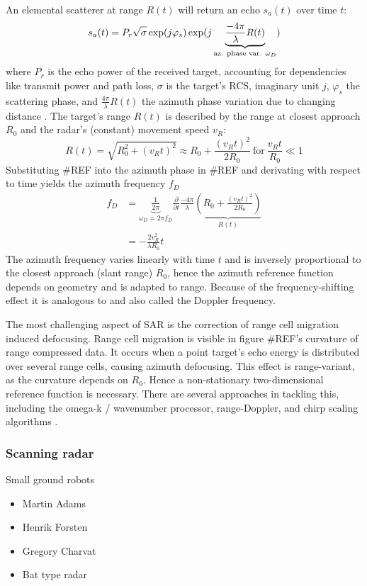 An elemental scatterer at range \(R(t)\) will return an echo \(s_a(t)\)
over time \(t\): \[
s_a(t) = P_r \sqrt{\sigma\vphantom{1}} \exp(j\varphi_s)\exp(j \underbrace{\frac{-4\pi}{\lambda}R(t)}_\text{az. phase var. $\omega_D$})
\] where \(P_r\) is the echo power of the received target, accounting
for dependencies like transmit power and path loss, \(\sigma\) is the
target's RCS, imaginary unit \(j\), \(\varphi_s\) the scattering phase,
and \(\frac{4\pi}{\lambda}R(t)\) the azimuth phase variation due to
changing distance \cite{Cumming2004}. The target's range \(R(t)\) is
described by the range at closest approach \(R_0\) and the radar's
(constant) movement speed \(v_R\): \[
R(t) = \sqrt{R_0^2+\left(v_Rt\right)^2} \approx R_0 + \frac{(v_Rt)^2}{2R_0} ~\text{for}~ \frac{v_Rt}{R_0} \ll 1
\] Substituting \#REF into the azimuth phase in \#REF and derivating
with respect to time yields the azimuth frequency \(f_D\) \[
\begin{align}
f_D &= \underbrace{\frac{1}{2\pi}}_{\omega_D = 2\pi f_D} \frac{\partial}{\partial t} \frac{-4\pi}{\lambda}  \underbrace{\left( R_0 + \frac{(v_Rt)^2}{2R_0}  \right)}_{R(t)} \\
&= -\frac{2v_R^2}{\lambda R_0}t
\end{align}
\] The azimuth frequency varies linearly with time \(t\) and is
inversely proportional to the closest approach (slant range) \(R_0\),
hence the azimuth reference function depends on geometry and is adapted
to range. Because of the frequency-shifting effect it is analogous to
and also called the Doppler frequency.

The most challenging aspect of SAR is the correction of range cell
migration induced defocusing. Range cell migration is visible in figure
\#REF's curvature of range compressed data. It occurs when a point
target's echo energy is distributed over several range cells, causing
azimuth defocusing. This effect is range-variant, as the curvature
depends on \(R_0\). Hence a non-stationary two-dimensional reference
function is necessary. There are several approaches in tackling this,
including the omega-k / wavenumber processor, range-Doppler, and chirp
scaling algorithms \cite{Moreira2013}.

\subsubsection{Scanning radar}\label{scanning-radar}

Small ground robots

\begin{itemize}
\tightlist
\item
  Martin Adams
\item
  Henrik Forsten
\item
  Gregory Charvat
\item
  Bat type radar
\end{itemize}

